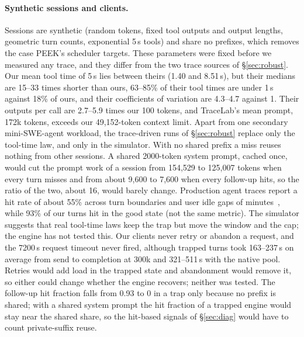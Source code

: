 \paragraph{Synthetic sessions and clients.} Sessions are synthetic (random tokens, fixed tool outputs and output lengths, geometric turn counts, exponential 5\,s tools) and share no prefixes, which removes the case PEEK's scheduler targets. These parameters were fixed before we measured any trace, and they differ from the two trace sources of \S\ref{sec:robust}. Our mean tool time of 5\,s lies between theirs (1.40 and 8.51\,s), but their medians are 15--33 times shorter than ours, 63--85\% of their tool times are under 1\,s against 18\% of ours, and their coefficients of variation are 4.3--4.7 against 1. Their outputs per call are 2.7--5.9 times our 100 tokens, and TraceLab's mean prompt, 172k tokens, exceeds our 49,152-token context limit. Apart from one secondary mini-SWE-agent workload, the trace-driven runs of \S\ref{sec:robust} replace only the tool-time law, and only in the simulator. With no shared prefix a miss reuses nothing from other sessions. A shared 2000-token system prompt, cached once, would cut the prompt work of a session from 154,529 to 125,007 tokens when every turn misses and from about 9,600 to 7,600 when every follow-up hits, so the ratio of the two, about 16, would barely change. Production agent traces report a hit rate of about 55\% across turn boundaries and user idle gaps of minutes~\citep{liu2026copilot}, while 93\% of our turns hit in the good state (not the same metric). The simulator suggests that real tool-time laws keep the trap but move the window and the cap; the engine has not tested this. Our clients never retry or abandon a request, and the 7200\,s request timeout never fired, although trapped turns took 163--237\,s on average from send to completion at 300k and 321--511\,s with the native pool. Retries would add load in the trapped state and abandonment would remove it, so either could change whether the engine recovers; neither was tested. The follow-up hit fraction falls from 0.93 to 0 in a trap only because no prefix is shared; with a shared system prompt the hit fraction of a trapped engine would stay near the shared share, so the hit-based signals of \S\ref{sec:diag} would have to count private-suffix reuse.

